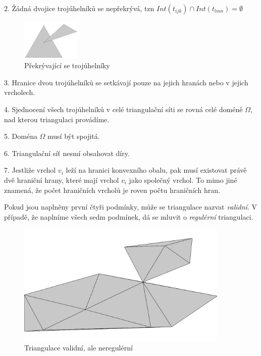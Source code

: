 \documentclass[12pt,a4paper]{article}
\begin{document}
2. Žádná dvojice trojúhelníků se nepřekrývá, tzn $Int(t_{ijk}) \cap Int(t_{lmn}) = \emptyset$
\begin{figure}[h!]
\centering
\includegraphics[width=0.25\textwidth]{../img/podm_2.png}
\caption{Překrývající se trojúhelníky}
\label{fig:podm_1}
\end{figure}

3. Hranice dvou trojúhelníků se setkávají pouze na jejich hranách nebo v jejich vrcholech.

4. Sjednocení všech trojúhelníků v celé triangulační síti se rovná celé doméně $\Omega$, nad kterou triangulaci provádíme.

5. Doména $\Omega$ musí být spojitá.

6. Triangulační síť nesmí obsahovat díry.

7. Jestliže vrchol $v_i$ leží na hranici konvexního obalu, pak musí existovat právě dvě hraniční hrany, které mají vrchol $v_i$ jako společný vrchol. To mimo jiné znamená, že počet hraničních vrcholů je roven počtu hraničních hran.


Pokud jsou naplněny první čtyři podmínky, může se triangulace nazvat \textit{validní}. V případě, že naplníme všech sedm podmínek, dá se mluvit o \textit{regulérní} triangulaci.

\newpage
\begin{figure}[h!]
\centering
\includegraphics[width=0.9\textwidth]{../img/vnr.png}
\caption{Triangulace validní, ale neregulérní}
\label{fig:trian_valid_not_reg}
\end{figure}
\end{document}
